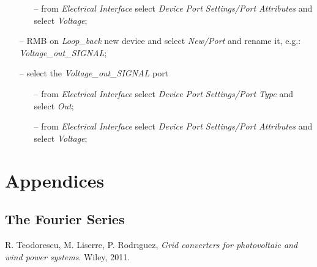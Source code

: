 \documentclass[11pt,a4paper,oneside]{book}
\numberwithin{equation}{section}
\theoremstyle{it}
\theoremstyle{definition}
\begin{document}
\begin{itemize}
\begin{itemize}
			\item[--] from \textit{Electrical Interface} select \textit{Device Port Settings/Port Attributes} and select \textit{Voltage};
		\end{itemize}
	\item[--] RMB on \textit{Loop\_back} new device and select \textit{New/Port} and rename it, e.g.: \textit{Voltage\_out\_SIGNAL};
		\item[--] select the \textit{Voltage\_out\_SIGNAL} port
		\begin{itemize}
			\item[--] from \textit{Electrical Interface} select \textit{Device Port Settings/Port Type} and select \textit{Out};
			\item[--] from \textit{Electrical Interface} select \textit{Device Port Settings/Port Attributes} and select \textit{Voltage};
		\end{itemize}	
\end{itemize}


\chapter{Appendices}	
\section{The Fourier Series}



\begin{thebibliography}{99}
	R. Teodorescu, M. Liserre, P. Rodrıguez, \emph{Grid converters for photovoltaic and wind power systems}. Wiley, 2011.
\end{thebibliography}
\end{document}
